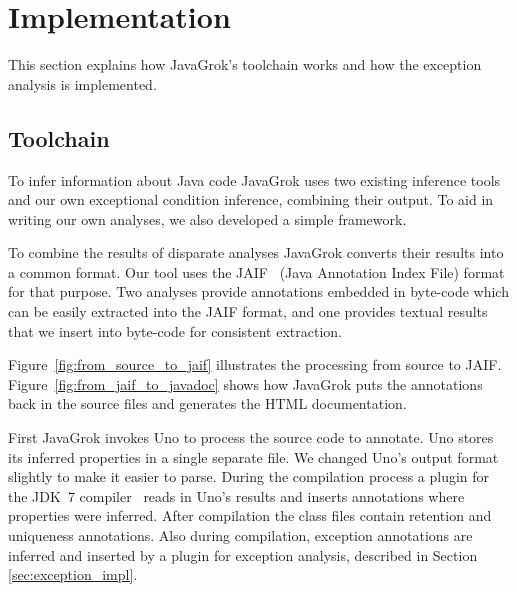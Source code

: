 \section{Implementation}
This section explains how JavaGrok's toolchain works and
how the exception analysis is implemented.

\subsection{Toolchain}

\begin{figure*}
\centering
{}
\caption{JavaGrok's toolchain from source to JAIF}
\label{fig:from_source_to_jaif}
\end{figure*}

To infer information about Java code JavaGrok uses two existing inference tools and 
our own exceptional condition inference, combining their output. 
To aid in writing our own analyses, we also developed a simple 
framework. 

To combine the results of disparate analyses JavaGrok converts their results
into a common format.  Our tool uses the JAIF~\cite{JAIF}
(Java Annotation Index File) format for that purpose. Two analyses provide 
annotations embedded in byte-code which can be easily extracted into the JAIF 
format, and one provides textual results that we insert into byte-code for
consistent extraction.

Figure~\ref{fig:from_source_to_jaif} 
illustrates the processing from source to JAIF. Figure~\ref{fig:from_jaif_to_javadoc} shows how JavaGrok
puts the annotations back in the source files and generates the HTML
documentation.

\begin{figure*}
\centering
{}
\caption{JavaGrok's toolchain from JAIF to Javadoc}
\label{fig:from_jaif_to_javadoc}
\end{figure*}

First JavaGrok invokes Uno to process the source code to annotate. 
Uno stores its inferred properties in a single separate file. We changed Uno's 
output format slightly to make it easier to parse.
During the compilation process a plugin for the JDK~7 compiler~\cite{jdk7} reads in Uno's results 
and inserts annotations where properties were inferred. 
After compilation the class files contain retention and uniqueness
annotations.
Also during compilation, exception annotations are inferred and inserted by a
plugin for exception analysis, described in Section \ref{sec:exception_impl}. 

